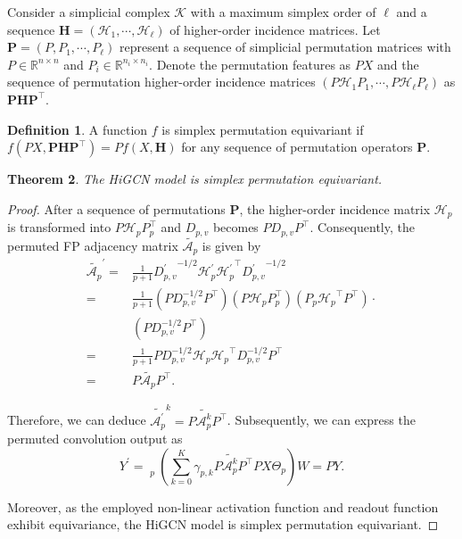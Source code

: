 \documentclass[letterpaper]{article} \usepackage{aaai24}
\theoremstyle{plain}
\newtheorem{theorem}{Theorem}[section]
\theoremstyle{definition}
\newtheorem{definition}[theorem]{Definition}
\theoremstyle{remark}
\begin{document}
Consider a simplicial complex $\mathcal{K}$ with a maximum simplex order of $\ell$ and a sequence $\mathbf{H}=\left(\mathcal{H}_1,\cdots,\mathcal{H}_\ell\right)$ of higher-order incidence matrices. 
Let $\mathbf{P} = \left(P, P_1,\cdots,P_\ell\right)$ represent a sequence of simplicial permutation matrices with $P\in \mathbb{R}^{n \times n}$ and $P_i\in \mathbb{R}^{n_i \times n_i}$. 
Denote the permutation features as $PX$ and the sequence of permutation higher-order incidence matrices $\left(P \mathcal{H}_1 P_1, \cdots, P\mathcal{H}_\ell P_\ell\right)$ as $\mathbf{PHP}^\top$.



\begin{definition}
A function $f$ is simplex permutation equivariant if $f\left(PX, \mathbf{PHP}^\top\right) = Pf\left(X, \mathbf{H}\right)$ for any sequence of permutation operators $\mathbf{P}$.
\end{definition}


\begin{theorem}
\label{the:equivariance}
The HiGCN model is simplex permutation equivariant.
\end{theorem}

\begin{proof}After a sequence of permutations $\mathbf{P}$, the higher-order incidence matrix $\mathcal{H}_p$ is transformed into $P\mathcal{H}_p P_p^\top$ and  $D_{p,v}$ becomes $PD_{p,v}P^\top$. Consequently,  the permuted FP adjacency matrix $\tilde{\mathcal{A}_p}$ is given by 
\begin{equation}
\begin{split}
    \tilde{\mathcal{A}_p}^\prime
     = & \frac{1}{p+1} {D_{p,v}^\prime}^{-1/2}\mathcal{H}_p^\prime{\mathcal{H}_p^\prime}^\top {D_{p,v}^\prime}^{-1/2}\\
     = & \frac{1}{p+1} \left(P D_{p,v}^{-1/2} P^\top \right)
    \left(P\mathcal{H}_p P_p^\top \right)
    \left(P_p {\mathcal{H}_p}^\top P^\top \right)\cdot\\
    &\left(P  D_{p,v}^{-1/2} P^\top \right)\\
     = & \frac{1}{p+1} P D_{p,v}^{-1/2} \mathcal{H}_p {\mathcal{H}_p}^\top D_{p,v}^{-1/2} P^\top \\ 
     = & P \tilde{\mathcal{A}_p} P^\top .
\end{split}
\end{equation}

Therefore, we can deduce $\tilde{\mathcal{A}_p^\prime}^k = P \tilde{\mathcal{A}_p^k} P^\top$. Subsequently, we can express the permuted convolution output as
\begin{equation}
    Y^\prime =   \mathop{\Big|\!\Big|}\limits_{p} \left(\sum_{k=0}^K \gamma_{p,k} P \tilde{\mathcal{A}_p^k} P^\top 
 PX \Theta_p \right) W = P Y.
\end{equation}

Moreover, as the employed non-linear activation function and readout function exhibit equivariance, the HiGCN model is simplex permutation equivariant.
\end{proof}
\end{document}
